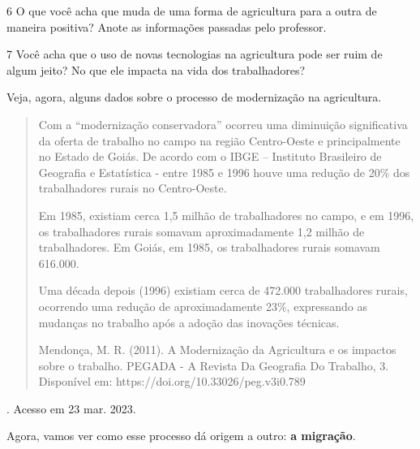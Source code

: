 \begin{itemize}
\begin{itemize}
\begin{itemize}
\begin{itemize}
{{\begin{itemize}
\begin{itemize}
\num{6} O que você acha que muda de uma forma de agricultura para a outra de
maneira positiva? Anote as informações passadas pelo professor. 



\num{7} Você acha que o uso de novas tecnologias na agricultura pode ser ruim de
algum jeito? No que ele impacta na vida dos trabalhadores?


Veja, agora, alguns dados sobre o processo de modernização na agricultura.

\begin{quote}
Com a ``modernização conservadora'' ocorreu uma diminuição significativa
da oferta de trabalho no campo na região Centro-Oeste e principalmente
no Estado de Goiás. De acordo com o IBGE -- Instituto Brasileiro de
Geografia e Estatística - entre 1985 e 1996 houve uma redução de 20\%
dos trabalhadores rurais no Centro-Oeste.

Em 1985, existiam cerca 1,5 milhão de trabalhadores no campo, e em 1996,
os trabalhadores rurais somavam aproximadamente 1,2 milhão de
trabalhadores. Em Goiás, em 1985, os trabalhadores rurais somavam
616.000.

Uma década depois (1996) existiam cerca de 472.000 trabalhadores rurais,
ocorrendo uma redução de aproximadamente 23\%, expressando as mudanças
no trabalho após a adoção das inovações técnicas.

Mendonça, M. R. (2011). A Modernização da Agricultura e os impactos
sobre o trabalho. {PEGADA - A Revista Da Geografia Do Trabalho,
3}. Disponível em: https://doi.org/10.33026/peg.v3i0.789
\end{quote}. Acesso em 23 mar. 2023.


Agora, vamos ver como esse processo dá origem a outro: \textbf{a migração}.

\end{itemize}
\end{itemize}}}
\end{itemize}
\end{itemize}
\end{itemize}
\end{itemize}
